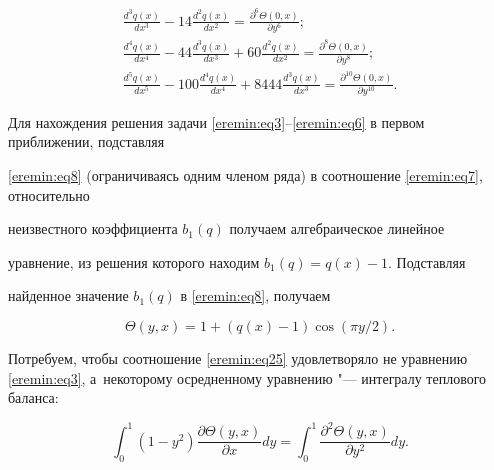 \begin{gather}

\label{eremin:eq23}

\frac{d^3q(x)}{dx^3}-14\frac{d^2q(x)}{dx^2}=\frac{\partial ^6\Theta

(0,  x)}{\partial y^6};\\

\label{eremin:eq24}

\frac{d^4q(x)}{dx^4}-44\frac{d^3q(x)}{dx^3}+60\frac{d^2q(x)}{dx^2}=\frac{\partial

^8\Theta (0,  x)}{\partial y^8};\\

\label{eremin:eq25}

\frac{d^5q(x)}{dx^5}-100\frac{d^4q(x)}{dx^4}+8444\frac{d^3q(x)}{dx^3}=\frac{\partial

^{10}\Theta (0,  x)}{\partial y^{10}}.

\end{gather}



Для нахождения решения задачи \eqref{eremin:eq3}--\eqref{eremin:eq6} в первом приближении, подставляя

\eqref{eremin:eq8} (ограничиваясь одним членом ряда) в соотношение \eqref{eremin:eq7}, относительно

неизвестного коэффициента $b_1 (q)$ получаем алгебраическое линейное

уравнение, из решения которого находим $b_1 (q)=q(x)-1$. Подставляя

найденное значение $b_1 (q)$ в \eqref{eremin:eq8}, получаем

\begin{equation}

\label{eremin:eq26}

\Theta (y,x)=1+(q(x)-1)\cos (\pi y/2).

\end{equation}



Потребуем, чтобы соотношение  \eqref{eremin:eq25} удовлетворяло не уравнению \eqref{eremin:eq3}, а~некоторому осредненному уравнению "--- интегралу теплового баланса:

\begin{equation}

\label{eremin:eq27}

\int _0^1 (1-y^2)\frac{\partial \Theta (y,x)}{\partial x}

dy=\int _0^1 \frac{\partial ^2\Theta (y,x)}{\partial y^2}dy.

\end{equation}



